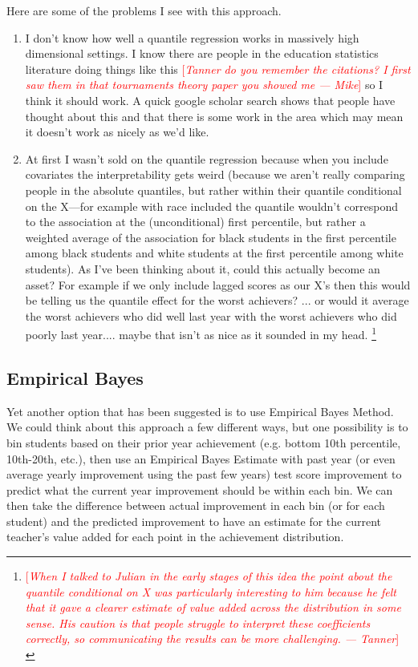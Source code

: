 \documentclass[letterpaper,12pt]{article}
\newcommand\cmnt[2]{\;
{\textcolor{red}{[{\em #1 --- #2}] \;}
}}
\newcommand\Mike[1]{\cmnt{#1}{Mike}}
\newcommand\Tannernote[1]{\footnote{\cmnt{#1}{Tanner}}}
\begin{document}
Here are some of the problems I see with this approach.
\begin{enumerate}
    \item I don't know how well a quantile regression works in massively high dimensional settings. I know there are people in the education statistics literature doing things like this \Mike{Tanner do you remember the citations? I first saw them in that tournaments theory paper you showed me} so I think it should work. A quick google scholar search shows that people have thought about this and that there is some work in the area which may mean it doesn't work as nicely as we'd like. 
    \item At first I wasn't sold on the quantile regression because when you include covariates the interpretability gets weird (because we aren't really comparing people in the absolute quantiles, but rather within their quantile conditional on the X---for example with race included the quantile wouldn't correspond to the association at the (unconditional) first percentile, but rather a weighted average of the association for black students in the first percentile among black students and white students at the first percentile among white students). As I've been thinking about it, could this actually become an asset? For example if we only include lagged scores as our X's then this would be telling us the quantile effect for the worst achievers? ... or would it average the worst achievers who did well last year with the worst achievers who did poorly last year.... maybe that isn't as nice as it sounded in my head. \Tannernote{When I talked to Julian in the early stages of this idea the point about the quantile conditional on X was particularly interesting to him because he felt that it gave a clearer estimate of value added across the distribution in some sense. His caution is that people struggle to interpret these coefficients correctly, so communicating the results can be more challenging.}
\end{enumerate}


\subsection{Empirical Bayes}
Yet another option that has been suggested is to use Empirical Bayes Method. We could think about this approach a few different ways, but one possibility is to bin students based on their prior year achievement (e.g. bottom 10th percentile, 10th-20th, etc.), then use an Empirical Bayes Estimate with past year (or even average yearly improvement using the past few years) test score improvement to predict what the current year improvement should be within each bin. We can then take the difference between actual improvement in each bin (or for each student) and the predicted improvement to have an estimate for the current teacher's value added for each point in the achievement distribution.
\end{document}
